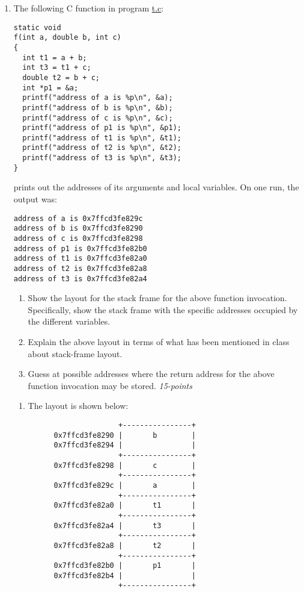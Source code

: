 \documentclass[12pt]{article}
\begin{document}
\begin{enumerate}
\item The following C function in program \href{./t.c}{t.c}:

\begin{verbatim}
static void
f(int a, double b, int c)
{
  int t1 = a + b;
  int t3 = t1 + c;
  double t2 = b + c;
  int *p1 = &a;
  printf("address of a is %p\n", &a);
  printf("address of b is %p\n", &b);
  printf("address of c is %p\n", &c);
  printf("address of p1 is %p\n", &p1);
  printf("address of t1 is %p\n", &t1);
  printf("address of t2 is %p\n", &t2);
  printf("address of t3 is %p\n", &t3);
}  
\end{verbatim}

prints out the addresses of its arguments and local variables.  On one run,
the output was:

\begin{verbatim}
address of a is 0x7ffcd3fe829c
address of b is 0x7ffcd3fe8290
address of c is 0x7ffcd3fe8298
address of p1 is 0x7ffcd3fe82b0
address of t1 is 0x7ffcd3fe82a0
address of t2 is 0x7ffcd3fe82a8
address of t3 is 0x7ffcd3fe82a4
\end{verbatim}

\begin{enumerate}
\item Show the layout for the stack frame for the above function
  invocation.  Specifically, show the stack frame with the specific
  addresses occupied by the different variables.

\item Explain the above layout in terms of what has been mentioned
  in class about stack-frame layout.

\item Guess at possible addresses where the return address for
  the above function invocation may be stored. \hfill\textit{15-points}

  \end{enumerate}

\begin{enumerate}
\item The layout is shown below:

\begin{verbatim}
                     +----------------+
      0x7ffcd3fe8290 |       b        | 
      0x7ffcd3fe8294 |                |
                     +----------------+
      0x7ffcd3fe8298 |       c        |
                     +----------------+
      0x7ffcd3fe829c |       a        |
                     +----------------+
      0x7ffcd3fe82a0 |       t1       |
                     +----------------+
      0x7ffcd3fe82a4 |       t3       |
                     +----------------+
      0x7ffcd3fe82a8 |       t2       |
                     +----------------+
      0x7ffcd3fe82b0 |       p1       |
      0x7ffcd3fe82b4 |                |
                     +----------------+
\end{verbatim}


\end{enumerate}
\end{enumerate}
\end{document}
